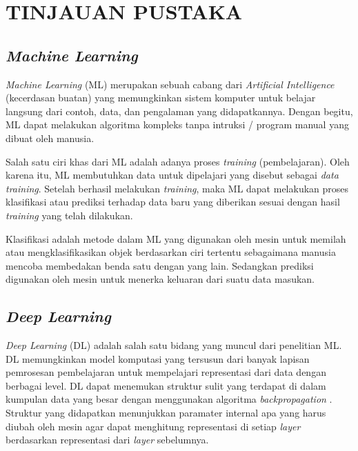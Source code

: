 \chapter{TINJAUAN PUSTAKA}


\section{\textit{Machine Learning}}


\textit{Machine Learning} (ML) merupakan sebuah cabang dari \textit{Artificial Intelligence} (kecerdasan buatan) yang memungkinkan sistem
komputer untuk belajar langsung dari contoh, data, dan pengalaman yang didapatkannya. Dengan begitu, ML dapat melakukan algoritma kompleks tanpa intruksi / program manual yang dibuat oleh manusia.

Salah satu ciri khas dari ML adalah adanya proses \textit{training} (pembelajaran). Oleh karena itu, ML membutuhkan data untuk dipelajari yang disebut sebagai \textit{data training}. Setelah berhasil melakukan \textit{training}, maka ML dapat melakukan proses klasifikasi atau prediksi terhadap data baru yang diberikan sesuai dengan hasil \textit{training} yang telah dilakukan.

Klasifikasi adalah metode dalam ML yang digunakan oleh mesin untuk memilah atau mengklasifikasikan objek berdasarkan ciri tertentu sebagaimana manusia mencoba membedakan benda satu dengan yang lain\citep{shalev-shwartz_ben-david_2014}. Sedangkan prediksi digunakan oleh mesin untuk menerka keluaran dari suatu data masukan. 

\section{\textit{Deep Learning}}
\textit{Deep Learning} (DL) adalah salah satu bidang yang muncul dari penelitian ML.
DL memungkinkan model komputasi yang tersusun dari banyak lapisan pemrosesan pembelajaran untuk mempelajari representasi dari data dengan berbagai level.
DL dapat menemukan struktur sulit yang terdapat di dalam kumpulan data yang besar dengan menggunakan algoritma \textit{backpropagation} \citep{DBLP:journals/corr/ZhangBHRV16}.
Struktur yang didapatkan menunjukkan paramater internal apa yang harus diubah oleh mesin agar dapat menghitung representasi di setiap \textit{layer} berdasarkan representasi dari \textit{layer} sebelumnya.

